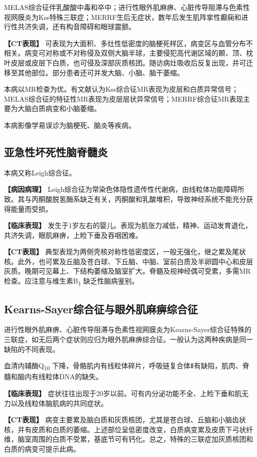 MELAS综合征伴乳酸酸中毒和卒中；进行性眼外肌麻痹、心脏传导阻滞与色素性视网膜炎为Kss特殊三联症；MERRF生后无症状，数年后发生肌阵挛性癫痫和进行性共济失调，还有构音障碍和眼球震颤。

\textbf{【CT表现】}
可表现为大面积、多灶性低密度的脑梗死样区，病变区与血管分布不相关。病变可对称或不对称侵及双侧大脑半球，主要侵犯高代谢区域的颞、顶、枕叶皮层或皮层下白质，也可侵及深部灰质核团。随访病灶吸收后反复出现，并可迁移至其他部位。部分患者还可并发大脑、小脑、脑干萎缩。

本病以MR检查为优。有文献认为Kss综合征MR表现为皮层和白质异常信号；MELAS综合征的特征性MR表现为皮层层状异常信号；MERRF综合征MR表现主要为大脑白质病变和小脑萎缩。

本病影像学易误诊为脑梗死、脑炎等疾病。

\subsection{亚急性坏死性脑脊髓炎}

本病又称Leigh综合征。

\textbf{【病因病理】}
Leigh综合征为常染色体隐性遗传性代谢病，由线粒体功能障碍所致。其与丙酮酸脱氢酶系缺乏有关，丙酮酸和乳酸堆积，导致神经系统不能充分获得能量而受损。

\textbf{【临床表现】}
发生于1岁左右的婴儿。表现为肌张力减低，精神、运动发育退化，共济失调，眼肌麻痹，上睑下垂及吞咽困难。

\textbf{【CT表现】}
典型表现为两侧壳核对称性低密度区，一般无强化，继之累及尾状核。此外，也可累及丘脑及苍白球、下丘脑、中脑、室前白质及半卵圆中心和皮层灰质。晚期可见幕上、下结构萎缩及脑室扩大。脊髓及视神经偶可受累，多需MR检查。应注意与维生素B\textsubscript{1}
缺乏性脑病鉴别。

\subsection{Kearns-Sayer综合征与眼外肌麻痹综合征}

进行性眼外肌麻痹、心脏传导阻滞与色素性视网膜炎为Kearns-Sayer综合征特殊的三联症，如无后两个症状则应归为眼外肌麻痹综合征。一般认为这两种疾病是同一缺陷的不同表现。

血清内辅酶Q\textsubscript{10}
下降，骨骼肌内有线粒体碎片，呼吸链复合体Ⅱ有缺陷，肌肉、脊髓和脑内有线粒体DNA的缺失。

\textbf{【临床表现】}
症状往往出现于20岁以前。可有内分泌功能不全、上睑下垂和肌无力以及线粒体脑肌病的共同症状。

\textbf{【CT表现】}
病变主要累及脑白质和灰质核团，尤其是苍白球、丘脑和小脑齿状核，并有皮质和白质的萎缩。上述部位呈低密度改变，白质病变累及皮质下弓状纤维，脑室周围的白质不受累，基底节可有钙化。总之，特殊的三联症加灰质核团和白质的病变可提示此病。

